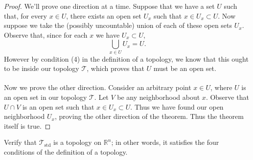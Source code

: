 \documentclass[letterpaper,12pt,twoside]{maths}
\begin{document}
\begin{proof}
    We'll prove one direction at a time. Suppose that
    we have a set $U$ such that, for every $x \in U$, there exists an
    open set $U_x$ such that $x \in U_x \subset U$. Now suppose we
    take the (possibly uncountable) union of each of these open sets
    $U_x$. Observe that, since for each $x$ we have $U_x \subset U$,
    \[
        \bigcup\limits_{x \in U} U_x = U.
    \] 
    However by condition (4) in the
    definition of a topology, we know that this ought to be inside our
    topology $\mathscr{T}$, which proves that $U$ must be an open set.
    \\
    \\
    Now we prove the other direction. Consider an arbitrary point $x
    \in U$, where $U$ is an open set in our topology $\mathscr{T}$.
    Let $V$ be any neighborhood about $x$. Observe that $U \cap V$ is
    an open set such that $x \in U_x \subset U.$ Thus we have found
    our open neighborhood $U_x$, proving the other direction of the
    theorem. Thus the theorem itself is true. 

\end{proof}

\begin{exercise}[Exercise 3.4]
Verify that $\mathscr{T}_{\text{std}}$ is a
topology on $\mathbb{R}^n$; in other words, it satisfies the four
conditions of the definition of a topology. 
\end{exercise}
\end{document}
